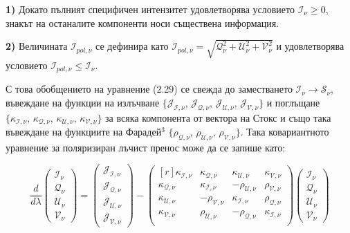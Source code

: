 \noindent\textbf{1)} Докато пълният специфичен интензитет удовлетворява условието $\mathcal{I}_\nu \ge 0$, знакът на останалите компоненти носи съществена информация.\\\newline

\noindent\textbf{2)} Величината $\mathcal{I}_{pol, \nu}$ се дефинира като $\mathcal{I}_{pol, \nu} = \sqrt{\mathcal{Q}_\nu^2 + \mathcal{U}_\nu^2 + \mathcal{V}_\nu^2}$ и удовлетворява условието $\mathcal{I}_{pol,\nu}\le\mathcal{I}_\nu$.\\\newline

\noindent С това обобщението на уравнение (2.29) се свежда до заместването $\mathcal{I}_\nu \rightarrow \mathcal{S}_\nu$, въвеждане на функции на излъчване $\{\mathcal{J}_\mathcal{I,\nu}, \,\mathcal{J}_\mathcal{Q,\nu},\, \mathcal{J}_\mathcal{U,\nu},\, \mathcal{J}_\mathcal{V,\nu}\}$ и поглъщане $\{\kappa_\mathcal{I,\nu}, \,\kappa_\mathcal{Q,\nu},\, \kappa_\mathcal{U,\nu},\, \kappa_\mathcal{V,\nu}\}$ за всяка компонента от вектора на Стокс и също така въвеждане на функциите на Фарадей$^3$ $\{\rho_\mathcal{Q,\nu},\, \rho_\mathcal{U,\nu},\, \rho_\mathcal{V,\nu}\}$. Така ковариантното уравнение за поляризиран лъчист пренос може да се запише като:

\begin{equation}
	\frac{d}{d\lambda} \begin{pmatrix}
							\mathcal{I}_\nu\\
							\mathcal{Q}_\nu\\
							\mathcal{U}_\nu\\
							\mathcal{V}_\nu
					     \end{pmatrix} = 
					     \begin{pmatrix}
					     	\mathcal{J}_\mathcal{I,\nu}\\
					     	\mathcal{J}_\mathcal{Q,\nu}\\
					     	\mathcal{J}_\mathcal{U,\nu}\\
					     	\mathcal{J}_\mathcal{V,\nu}
					     \end{pmatrix}
					     -	\begin{pmatrix*}[r]
					     	\kappa_\mathcal{I,\nu} & \kappa_\mathcal{Q,\nu} & \kappa_\mathcal{U,\nu} & \kappa_\mathcal{V,\nu}\\
					        \kappa_\mathcal{Q,\nu}& \kappa_\mathcal{I,\nu}& -\rho_\mathcal{U,\nu}& \rho_\mathcal{V,\nu}\\     	
					     	\kappa_\mathcal{U,\nu}& -\rho_\mathcal{V,\nu}& \kappa_\mathcal{I,\nu}& \rho_\mathcal{Q,\nu}\\	  
					     	 \kappa_\mathcal{V,\nu}& \rho_\mathcal{U,\nu}& -\rho_\mathcal{Q,\nu}& \kappa_\mathcal{I,\nu}\\
					     	\end{pmatrix*}
					     	\begin{pmatrix}
					     		\mathcal{I}_\nu\\
					     		\mathcal{Q}_\nu\\
					     		\mathcal{U}_\nu\\
					     		\mathcal{V}_\nu
					     	\end{pmatrix}
\end{equation}

